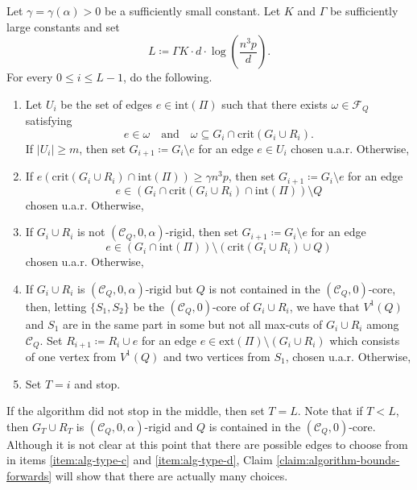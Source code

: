 \documentclass[11pt,a4paper,oneside,reqno]{amsart}
\newcommand{\cC}{\mathcal{C}}
\newcommand{\cF}{\mathcal{F}}
\newcommand{\1}{\mathbbm{1}} %
\renewcommand{\le}{\leqslant}
\renewcommand{\ge}{\geqslant}
\newcommand{\ext}{\mathrm{ext}}
\renewcommand{\int}{\mathrm{int}}
\newcommand{\crit}{\mathrm{crit}}
\begin{document}
Let $\gamma = \gamma(\alpha) > 0$ be a sufficiently small constant. Let $K$ and $\Gamma$ be sufficiently large constants and set
\[
    L \coloneqq \Gamma K \cdot d \cdot \log\left(\frac{n^3 p}{d}\right).
\]
For every $0 \le i \le L - 1$, do the following.
\begin{enumerate}[label=(\alph*)]
    \item\label{item:alg-type-a} Let $U_i$ be the set of edges $e \in \int(\Pi)$ such that there exists $\omega \in \cF_Q$ satisfying
    \[
        e \in \omega \quad \text{and} \quad \omega \subseteq G_i \cap \crit(G_i \cup R_i).
    \]
    If $|U_i| \ge m$, then set $G_{i+1} \coloneqq G_i \setminus e$ for an edge $e \in U_i$ chosen u.a.r. Otherwise,

    \item\label{item:alg-type-b} If $e(\crit(G_i \cup R_i) \cap \int(\Pi)) \ge \gamma n^3 p$, then set $G_{i+1} \coloneqq G_i \setminus e$ for an edge 
    \[
        e \in \left(G_i \cap \crit(G_i \cup R_i) \cap \int(\Pi)\right) \setminus Q
    \]       
    chosen u.a.r. Otherwise,

    \item\label{item:alg-type-c} If $G_i \cup R_i$ is not $(\cC_Q, 0, \alpha)$-rigid, then set $G_{i+1} \coloneqq G_i \setminus e$ for an edge 
    \[
        e \in (G_i \cap \int(\Pi)) \setminus (\crit(G_i \cup R_i) \cup Q)
    \] 
    chosen u.a.r. Otherwise,

    \item\label{item:alg-type-d} If $G_i \cup R_i$ is $(\cC_Q, 0, \alpha)$-rigid but $Q$ is not contained in the $(\cC_Q, 0)$-core, then, letting $\{S_1, S_2\}$ be the $(\cC_Q, 0)$-core of $G_i \cup R_i$, we have that $V^1(Q)$ and $S_1$ are in the same part in some but not all max-cuts of $G_i \cup R_i$ among $\cC_Q$. Set $R_{i+1} \coloneqq R_i \cup e$ for an edge $e \in \ext(\Pi) \setminus (G_i \cup R_i)$ which consists of one vertex from $V^1(Q)$ and two vertices from $S_1$, chosen u.a.r. Otherwise,

    \item Set $T = i$ and stop.    
\end{enumerate}
If the algorithm did not stop in the middle, then set $T = L$. Note that if $T < L$, then $G_T \cup R_T$ is $(\cC_Q, 0, \alpha)$-rigid and $Q$ is contained in the $(\cC_Q, 0)$-core. Although it is not clear at this point that there are possible edges to choose from in items \ref{item:alg-type-c} and \ref{item:alg-type-d}, Claim \ref{claim:algorithm-bounds-forwards} will show that there are actually many choices.
\end{document}
